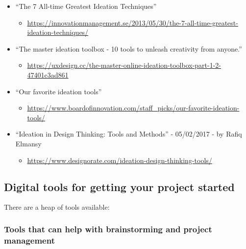 \documentclass[
]{book}
\providecommand{\tightlist}{%
  \setlength{\itemsep}{0pt}\setlength{\parskip}{0pt}}
\begin{document}
\begin{itemize}
\item
  ``The 7 All-time Greatest Ideation Techniques''

  \begin{itemize}
  \tightlist
  \item
    \url{https://innovationmanagement.se/2013/05/30/the-7-all-time-greatest-ideation-techniques/}
  \end{itemize}
\item
  ``The master ideation toolbox - 10 tools to unleash creativity from
  anyone.''

  \begin{itemize}
  \tightlist
  \item
    \url{https://uxdesign.cc/the-master-online-ideation-toolbox-part-1-2-47401c3ad861}
  \end{itemize}
\item
  ``Our favorite ideation tools''

  \begin{itemize}
  \tightlist
  \item
    \url{https://www.boardofinnovation.com/staff_picks/our-favorite-ideation-tools/}
  \end{itemize}
\item
  ``Ideation in Design Thinking: Tools and Methods'' - 05/02/2017 - by
  Rafiq Elmansy

  \begin{itemize}
  \tightlist
  \item
    \url{https://www.designorate.com/ideation-design-thinking-tools/}
  \end{itemize}
\end{itemize}

\hypertarget{digital-tools-for-getting-your-project-started}{%
\subsection{Digital tools for getting your project started}\label{digital-tools-for-getting-your-project-started}}

There are a heap of tools available:

\hypertarget{tools-that-can-help-with-brainstorming-and-project-management}{%
\subsubsection{Tools that can help with brainstorming and project management}\label{tools-that-can-help-with-brainstorming-and-project-management}}
\end{document}

